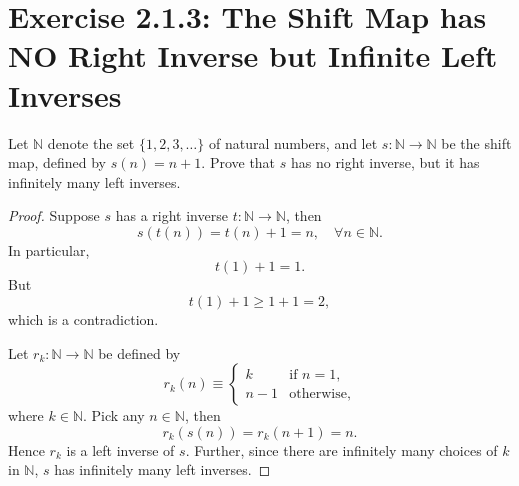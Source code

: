\documentclass{amsbook}
\theoremstyle{definition}
\theoremstyle{remark}
\numberwithin{section}{chapter}
\numberwithin{equation}{chapter}
\begin{document}
\section{Exercise 2.1.3: The Shift Map has NO Right Inverse but Infinite Left Inverses}
Let $\mathbb{N}$ denote the set $\{1,2,3,\dots\}$ of natural numbers, and let $s:\mathbb{N}\to\mathbb{N}$ be the shift map, defined by $s(n)=n+1$. Prove that $s$ has no right inverse, but it has infinitely many left inverses.
\begin{proof}
Suppose $s$ has a right inverse $t:\mathbb{N}\to\mathbb{N}$, then\[
s(t(n))=t(n)+1=n,\quad\forall n\in\mathbb{N}.
\]In particular,\[
t(1)+1=1.
\]But\[
t(1)+1\geqslant1+1=2,
\]which is a contradiction.

Let $r_k:\mathbb{N}\to\mathbb{N}$ be defined by\[
r_k(n)\equiv\begin{cases}
k & \text{if } n=1,\\
n-1 & \text{otherwise},
\end{cases}
\]where $k\in\mathbb{N}$. Pick any $n\in\mathbb{N}$, then\[
r_k(s(n))=r_k(n+1)=n.
\]Hence $r_k$ is a left inverse of $s$. Further, since there are infinitely many choices of $k$ in $\mathbb{N}$, $s$ has infinitely many left inverses.
\end{proof}
\end{document}
